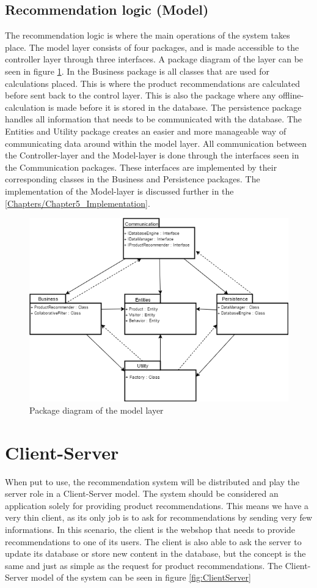 \subsection{Recommendation logic (Model)}
The recommendation logic is where the main operations of the system takes place. The model layer consists of four packages, and is made accessible to the controller layer through three interfaces. A package diagram of the layer can be seen in figure \ref{fig:PackageDiagram}. In the Business package is all classes that are used for calculations placed. This is where the product recommendations are calculated before sent back to the control layer. This is also the package where any offline-calculation is made before it is stored in the database. The persistence package handles all information that needs to be communicated with the database. The Entities and Utility package creates an easier and more manageable way of communicating data around within the model layer. All communication between the Controller-layer and the Model-layer is done through the interfaces seen in the Communication packages. These interfaces are implemented by their corresponding classes in the Business and Persistence packages. The implementation of the Model-layer is discussed further in the \ref{Chapters/Chapter5_Implementation}.

\begin{figure}
	\centering
	\includegraphics[width=.8\linewidth]{Figures/PackageDiagram.png}
	\caption{Package diagram of the model layer}
	\label{fig:PackageDiagram}
\end{figure}

\section{Client-Server}
When put to use, the recommendation system will be distributed and play the server role in a Client-Server model. The system should be considered an application solely for providing product recommendations. This means we have a very thin client, as its only job is to ask for recommendations by sending very few informations. In this scenario, the client is the webshop that needs to provide recommendations to one of its users. The client is also able to ask the server to update its database or store new content in the database, but the concept is the same and just as simple as the request for product recommendations. The Client-Server model of the system can be seen in figure \ref{fig:ClientServer}

